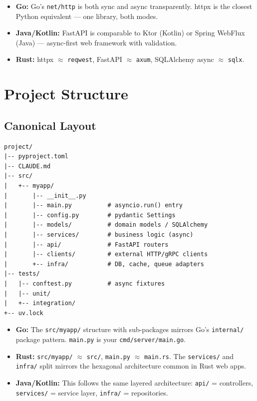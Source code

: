 \documentclass[11pt,a4paper,oneside]{book}
\begin{document}
\begin{analogybox}
\begin{itemize}
    \item \textcolor{goblue}{\textbf{Go:}} Go's \texttt{net/http} is both sync and async
          transparently. httpx is the closest Python equivalent --- one library, both modes.
    \item \textcolor{javaorange}{\textbf{Java/Kotlin:}} FastAPI is comparable to Ktor (Kotlin)
          or Spring WebFlux (Java) --- async-first web framework with validation.
    \item \textcolor{BrickRed}{\textbf{Rust:}} httpx $\approx$ \texttt{reqwest}, FastAPI $\approx$
          \texttt{axum}, SQLAlchemy async $\approx$ \texttt{sqlx}.
\end{itemize}
\end{analogybox}

\chapter{Project Structure}

\section{Canonical Layout}

\begin{lstlisting}[style=directory]
project/
|-- pyproject.toml
|-- CLAUDE.md
|-- src/
|   +-- myapp/
|       |-- __init__.py
|       |-- main.py          # asyncio.run() entry
|       |-- config.py        # pydantic Settings
|       |-- models/          # domain models / SQLAlchemy
|       |-- services/        # business logic (async)
|       |-- api/             # FastAPI routers
|       |-- clients/         # external HTTP/gRPC clients
|       +-- infra/           # DB, cache, queue adapters
|-- tests/
|   |-- conftest.py          # async fixtures
|   |-- unit/
|   +-- integration/
+-- uv.lock
\end{lstlisting}

\begin{analogybox}
\begin{itemize}
    \item \textcolor{goblue}{\textbf{Go:}} The \texttt{src/myapp/} structure with sub-packages
          mirrors Go's \texttt{internal/} package pattern. \texttt{main.py} is your \texttt{cmd/server/main.go}.
    \item \textcolor{BrickRed}{\textbf{Rust:}} \texttt{src/myapp/} $\approx$ \texttt{src/},
          \texttt{main.py} $\approx$ \texttt{main.rs}. The \texttt{services/} and \texttt{infra/}
          split mirrors the hexagonal architecture common in Rust web apps.
    \item \textcolor{javaorange}{\textbf{Java/Kotlin:}} This follows the same layered architecture:
          \texttt{api/} = controllers, \texttt{services/} = service layer, \texttt{infra/} = repositories.
\end{itemize}
\end{analogybox}
\end{document}

